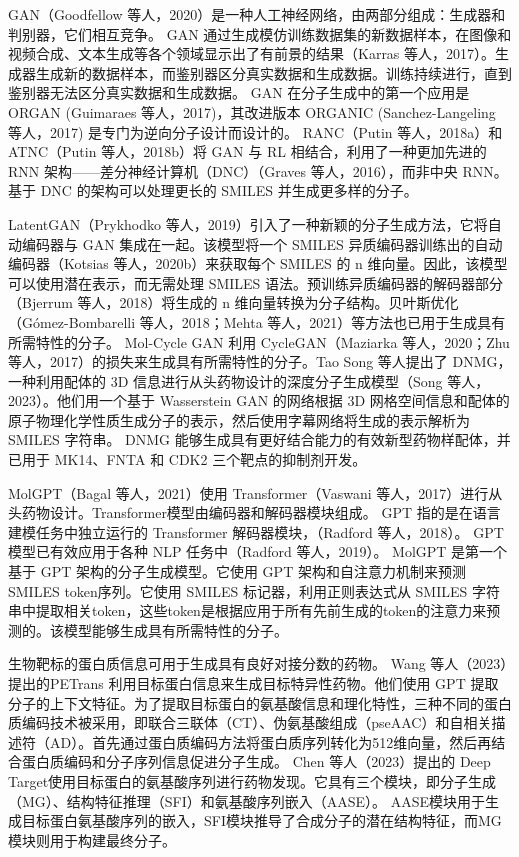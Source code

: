 GAN（Goodfellow 等人，2020）是一种人工神经网络，由两部分组成：生成器和判别器，它们相互竞争。 GAN 通过生成模仿训练数据集的新数据样本，在图像和视频合成、文本生成等各个领域显示出了有前景的结果（Karras 等人，2017）。生成器生成新的数据样本，而鉴别器区分真实数据和生成数据。训练持续进行，直到鉴别器无法区分真实数据和生成数据。 GAN 在分子生成中的第一个应用是 ORGAN (Guimaraes 等人，2017)，其改进版本 ORGANIC (Sanchez-Langeling 等人，2017) 是专门为逆向分子设计而设计的。 RANC（Putin 等人，2018a）和 ATNC（Putin 等人，2018b）将 GAN 与 RL 相结合，利用了一种更加先进的 RNN 架构——差分神经计算机（DNC）（Graves 等人，2016），而非中央 RNN。基于 DNC 的架构可以处理更长的 SMILES 并生成更多样的分子。

LatentGAN（Prykhodko 等人，2019）引入了一种新颖的分子生成方法，它将自动编码器与 GAN 集成在一起。该模型将一个 SMILES 异质编码器训练出的自动编码器（Kotsias 等人，2020b）来获取每个 SMILES 的 n 维向量。因此，该模型可以使用潜在表示，而无需处理 SMILES 语法。预训练异质编码器的解码器部分（Bjerrum 等人，2018）将生成的 n 维向量转换为分子结构。贝叶斯优化（Gómez-Bombarelli 等人，2018；Mehta 等人，2021）等方法也已用于生成具有所需特性的分子。 Mol-Cycle GAN 利用 CycleGAN（Maziarka 等人，2020；Zhu 等人，2017）的损失来生成具有所需特性的分子。Tao Song 等人提出了 DNMG，一种利用配体的 3D 信息进行从头药物设计的深度分子生成模型（Song 等人，2023）。他们用一个基于 Wasserstein GAN 的网络根据 3D 网格空间信息和配体的原子物理化学性质生成分子的表示，然后使用字幕网络将生成的表示解析为 SMILES 字符串。 DNMG 能够生成具有更好结合能力的有效新型药物样配体，并已用于 MK14、FNTA 和 CDK2 三个靶点的抑制剂开发。

MolGPT（Bagal 等人，2021）使用 Transformer（Vaswani 等人，2017）进行从头药物设计。Transformer模型由编码器和解码器模块组成。 GPT 指的是在语言建模任务中独立运行的 Transformer 解码器模块，（Radford 等人，2018）。 GPT 模型已有效应用于各种 NLP 任务中（Radford 等人，2019）。 MolGPT 是第一个基于 GPT 架构的分子生成模型。它使用 GPT 架构和自注意力机制来预测 SMILES token序列。它使用 SMILES 标记器，利用正则表达式从 SMILES 字符串中提取相关token，这些token是根据应用于所有先前生成的token的注意力来预测的。该模型能够生成具有所需特性的分子。

生物靶标的蛋白质信息可用于生成具有良好对接分数的药物。 Wang 等人（2023）提出的PETrans 利用目标蛋白信息来生成目标特异性药物。他们使用 GPT 提取分子的上下文特征。为了提取目标蛋白的氨基酸信息和理化特性，三种不同的蛋白质编码技术被采用，即联合三联体（CT）、伪氨基酸组成（pseAAC）和自相关描述符（AD）。首先通过蛋白质编码方法将蛋白质序列转化为512维向量，然后再结合蛋白质编码和分子序列信息促进分子生成。 Chen 等人（2023）提出的 Deep Target使用目标蛋白的氨基酸序列进行药物发现。它具有三个模块，即分子生成（MG）、结构特征推理（SFI）和氨基酸序列嵌入（AASE）。 AASE模块用于生成目标蛋白氨基酸序列的嵌入，SFI模块推导了合成分子的潜在结构特征，而MG模块则用于构建最终分子。

